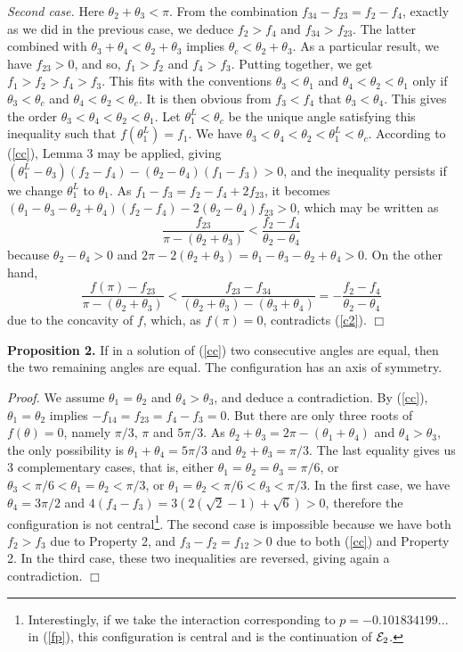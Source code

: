 \documentclass[11pt]{article}
\begin{document}
{\sl Second case.} Here $\theta_2+\theta_3<\pi$. From the
combination $f_{34}-f_{23}=f_2-f_4$, exactly as we did in the
previous case, we deduce $f_2>f_4$ and $f_{34}>f_{23}$. The latter combined with $\theta_3+\theta_4<\theta_2+\theta_3$ implies
$\theta_c<\theta_{2}+\theta_3$.
As a particular result, we have $f_{23}>0$, and so, $f_1>f_2$ and
$f_4>f_3$. Putting together, we get $f_1>f_2>f_4>f_3$. This fits with the conventions
$\theta_3<\theta_1$ and $\theta_4<\theta_2<\theta_1$ only if $\theta_3<\theta_c$ and $\theta_4<\theta_2<\theta_c$. It is then obvious
from $f_3<f_4$ that $\theta_3<\theta_4$. This gives the order
$\theta_3<\theta_4<\theta_2<\theta_1$. Let $\theta_1^L<\theta_c$ be the unique angle satisfying this inequality such that $f(\theta_1^L)=f_1$. We have $\theta_3<\theta_4<\theta_2<\theta_1^L<\theta_c$.
According to (\ref{cc}), Lemma 3 may be applied, giving
$(\theta_1^L-\theta_3)(f_2-f_4)-(\theta_2-\theta_4)(f_1-f_3)>0$, and the inequality persists if we change $\theta_1^L$ to $\theta_1$. As
$f_1-f_3=f_2-f_4+2f_{23}$, it becomes
$(\theta_1-\theta_3-\theta_2+\theta_4)(f_2-f_4)-2(\theta_2-\theta_4)f_{23}>0$, which may be written as
\begin{equation}\label{c2}
\frac{f_{23}}{\pi-(\theta_2+\theta_3)}<\frac{f_2-f_4}{\theta_2-\theta_4}
\end{equation}
because $\theta_2-\theta_4>0$ and $2\pi-2(\theta_2+\theta_3)=\theta_1-\theta_3-\theta_2+\theta_4>0$. On the other hand,
$$\frac{f(\pi)-f_{23}}{\pi-(\theta_2+\theta_3)}<\frac{f_{23}-f_{34}}{(\theta_2+\theta_3)-(\theta_3+\theta_4)}=-\frac{f_{2}-f_{4}}{\theta_2-\theta_4}$$
due to the concavity of $f$, which, as $f(\pi)=0$, contradicts (\ref{c2}). $\Box$




{\bf Proposition 2.} If in a solution of (\ref{cc}) two consecutive
angles are equal, then the two remaining angles are equal. The
configuration has an axis of symmetry.

{\sl Proof.} We assume $\theta_1=\theta_2$ and $\theta_4>\theta_3$,
and deduce a contradiction. By (\ref{cc}), $\theta_1=\theta_2$
implies $-f_{14}=f_{23}=f_4-f_3=0$. But there are only three roots
of $f(\theta)=0$, namely $\pi/3$, $\pi$ and $5\pi/3$. As
$\theta_2+\theta_3=2\pi-(\theta_1+\theta_4)$ and
$\theta_4>\theta_3$, the only possibility is
$\theta_1+\theta_4=5\pi/3$ and $\theta_2+\theta_3=\pi/3$. The last
equality gives us 3 complementary cases, that is, either
$\theta_1=\theta_2=\theta_3=\pi/6$, or
$\theta_3<\pi/6<\theta_1=\theta_2<\pi/3$, or
$\theta_1=\theta_2<\pi/6<\theta_3<\pi/3$. In the first case, we have
$\theta_4=3\pi/2$ and $4(f_4-f_3)=3(2(\sqrt{2}-1)+\sqrt{6})>0$,
therefore the configuration is not central\footnote{Interestingly, if we take the
interaction corresponding to $p=-0.101834199...$ in ({\ref{fp}}),
this configuration is central and is the continuation of ${\cal E}_2$.}. The second case is
impossible because we have both $f_2>f_3$ due to Property 2, and
$f_3-f_2=f_{12}>0$ due to both (\ref{cc}) and
Property 2. In the third case, these two
inequalities are reversed, giving again a contradiction. $\Box$
\end{document}
